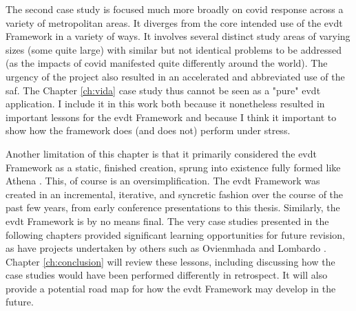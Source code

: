 The second case study is focused much more broadly on \ac{covid} response across a variety of metropolitan areas. It diverges from the core intended use of the \ac{evdt} Framework in a variety of ways. It involves several distinct study areas of varying sizes (some quite large) with similar but not identical problems to be addressed (as the impacts of \ac{covid} manifested quite differently around the world). The urgency of the project also resulted in an accelerated and abbreviated use of the \ac{saf}. The Chapter \ref{ch:vida} case study thus cannot be seen as a "pure" \ac{evdt} application. I include it in this work both because it nonetheless resulted in important lessons for the \ac{evdt} Framework and because I think it important to show how the framework does (and does not) perform under stress.

Another limitation of this chapter is that it primarily considered the \ac{evdt} Framework as a static, finished creation, sprung into existence fully formed like Athena \cite{hesiodTheogony-699}. This, of course is an oversimplification. The \ac{evdt} Framework was created in an incremental, iterative, and syncretic fashion over the course of the past few years, from early conference presentations \cite{reidCombiningSocialEnvironmental2019} to this thesis. Similarly, the \ac{evdt} Framework is by no means final. The very case studies presented in the following chapters provided significant learning opportunities for future revision, as have projects undertaken by others such as Ovienmhada \cite{ovienmhadaEnvironmentVulnerabilityDecisionTechnologyModelingFramework2021, ovienmhadaEarthObservationTechnology2020} and Lombardo \cite{lombardoEnvironmentVulnerabilityDecisionTechnologyFrameworkDecision2022}. Chapter \ref{ch:conclusion} will review these lessons, including discussing how the case studies would have been performed differently in retrospect. It will also provide a potential road map for how the \ac{evdt} Framework may develop in the future.
